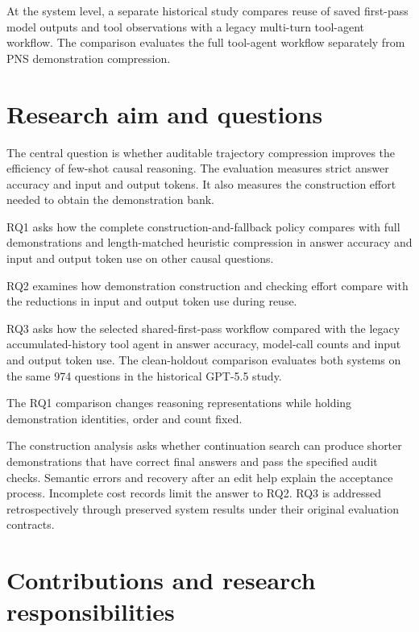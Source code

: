 At the system level, a separate historical study compares reuse of saved first-pass model outputs and tool observations with a legacy multi-turn tool-agent workflow. The comparison evaluates the full tool-agent workflow separately from PNS demonstration compression.

\section{Research aim and questions}\label{sec:1.2}

The central question is whether auditable trajectory compression improves the efficiency of few-shot causal reasoning. The evaluation measures strict answer accuracy and input and output tokens. It also measures the construction effort needed to obtain the demonstration bank.

RQ1 asks how the complete construction-and-fallback policy compares with full demonstrations and length-matched heuristic compression in answer accuracy and input and output token use on other causal questions.

RQ2 examines how demonstration construction and checking effort compare with the reductions in input and output token use during reuse.

RQ3 asks how the selected shared-first-pass workflow compared with the legacy accumulated-history tool agent in answer accuracy, model-call counts and input and output token use. The clean-holdout comparison evaluates both systems on the same 974 questions in the historical GPT-5.5 study.

The RQ1 comparison changes reasoning representations while holding demonstration identities, order and count fixed. 

The construction analysis asks whether continuation search can produce shorter demonstrations that have correct final answers and pass the specified audit checks. Semantic errors and recovery after an edit help explain the acceptance process. Incomplete cost records limit the answer to RQ2. RQ3 is addressed retrospectively through preserved system results under their original evaluation contracts.

\section{Contributions and research responsibilities}\label{sec:1.3}

